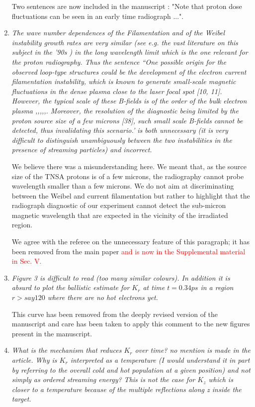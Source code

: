 \documentclass{article}
\begin{document}
\begin{enumerate}
Two sentences are now included in the manuscript : "Note that proton dose fluctuations can be seen in an early time radiograph ...".

\item \textit{The wave number dependences of the Filamentation and of the Weibel instability growth rates are very similar (see e.g. the vast literature on this subject in the '90s ) in the long wavelength limit which is the one relevant for the proton radiography. Thus the sentence ``One possible origin for the observed loop-type structures could be the development of the electron current filamentation instability, which is known to generate small-scale magnetic fluctuations in the dense plasma close to the laser focal spot [10, 11]. However, the typical scale of these B-fields is of the order of the bulk electron plasma ,,,,,. Moreover, the resolution of the diagnostic being limited by the proton source size of a few microns [38], such small scale B-fields cannot be detected, thus invalidating this scenario.' is both unnecessary (it is very difficult to distinguish unambiguously between the two instabilities in the presence of streaming particles) and incorrect.} 

We believe there was a misunderstanding here. We meant that, 
as the source size of the TNSA protons is of a few microns, the radiography cannot probe wavelength smaller than a few microns.  
We do not aim at discriminating between the Weibel and current filamentation but rather to highlight that the radiograph diagnostic of our experiment cannot detect the sub-micron magnetic wavelength that are expected in the vicinity of the irradiated region.

We  agree with the referee on the unnecessary feature of this paragraph;  it has been  removed from the main paper \textcolor{red}{and is now in the Supplemental material in Sec. V.}

\item \textit{Figure 3 is difficult to read (too many similar colours). In addition it is absurd to plot the ballistic estimate for $K_r$ at time $ t = 0.34 ps$ in a region $r > say 120$ where there are no hot electrons yet. }

This curve has been removed from the deeply revised version of the manuscript and care has been taken to apply this comment to the new figures present in the manuscript.

\item \textit{What is the mechanism that reduces $K_r$ over time? no mention is made in the article. Why is $K_r$ interpreted as a temperature (I would understand it in part by referring to the overall cold and hot population at a given position) and not simply as ordered streaming energy? This is not the case for $K_z$ which is closer to a temperature because of the multiple reflections along z inside the target.}


\end{enumerate}
\end{document}
